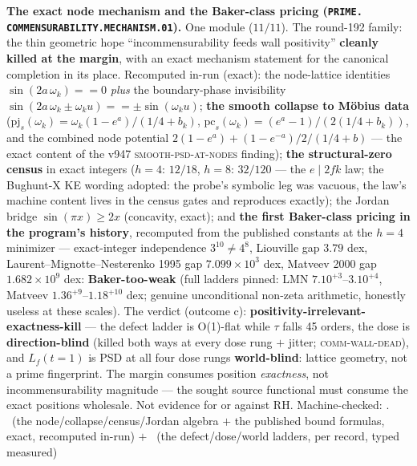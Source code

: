 \documentclass[11pt,a4paper]{article}
\theoremstyle{definition}
\begin{document}
\par\smallskip\noindent\textbf{The exact node mechanism and the
Baker-class pricing (\texttt{PRIME.\allowbreak
COMMENSURABILITY.\allowbreak MECHANISM.01}).}
One module ($11/11$).  The round-192 family: the thin geometric
hope ``incommensurability feeds wall positivity'' \textbf{cleanly
killed at the margin}, with an exact mechanism statement for the
canonical completion in its place.  Recomputed in-run (exact): the
node-lattice identities $\sin(2a\,\omega_k) == 0$ \emph{plus} the
boundary-phase invisibility $\sin(2a\,\omega_k \pm \omega_k u) ==
\pm\sin(\omega_k u)$; \textbf{the smooth collapse to M\"obius
data} ($\mathrm{pj}_s(\omega_k) = \omega_k(1 - e^a)/(1/4 + b_k)$,
$\mathrm{pc}_s(\omega_k) = (e^a - 1)/(2(1/4 + b_k))$, and the
combined node potential $2(1 - e^a) + (1 - e^{-a})/2/(1/4 + b)$
--- the exact content of the v947 \textsc{smooth-psd-at-nodes}
finding); \textbf{the structural-zero census} in exact integers
($h = 4$: $12/18$, $h = 8$: $32/120$ --- the $e \mid 2fk$ law;
the Bughunt-X KE wording adopted: the probe's symbolic leg was
vacuous, the law's machine content lives in the census gates and
reproduces exactly); the Jordan bridge $\sin(\pi x) \ge 2x$
(concavity, exact); and \textbf{the first Baker-class pricing in
the program's history}, recomputed from the published constants
at the $h = 4$ minimizer --- exact-integer independence $3^{10}
\ne 4^8$, Liouville gap $3.79$ dex, Laurent--Mignotte--Nesterenko
1995 gap $7.099\times10^3$ dex, Matveev 2000 gap
$1.682\times10^9$ dex: \textbf{Baker-too-weak} (full ladders
pinned: LMN $7.10^{+3}$--$3.10^{+4}$, Matveev
$1.36^{+9}$--$1.18^{+10}$ dex; genuine unconditional non-zeta
arithmetic, honestly useless at these scales).  The verdict
(outcome c): \textbf{positivity-irrelevant-exactness-kill} ---
the defect ladder is O(1)-flat while $\tau$ falls 45 orders, the
dose is \textbf{direction-blind} (killed both ways at every dose
rung $+$ jitter; \textsc{comm-wall-dead}), and $L_f(t = 1)$ is
PSD at all four dose rungs \textbf{world-blind}: lattice
geometry, not a prime fingerprint.  The margin consumes position
\emph{exactness}, not incommensurability magnitude --- the sought
source functional must consume the exact positions wholesale.
Not evidence for or against RH.
Machine-checked: .
\mE\ (the node/collapse/census/Jordan algebra $+$ the published
bound formulas, exact, recomputed in-run) $+$ \mC\ (the
defect/dose/world ladders, per record, typed measured)
\par\smallskip
\end{document}
